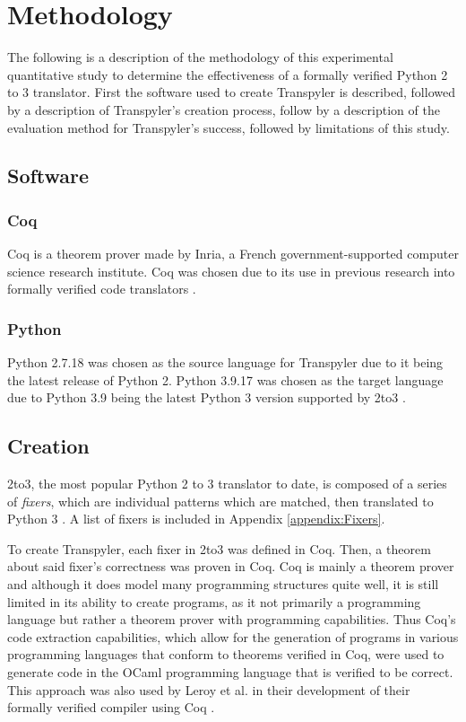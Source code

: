 \section{Methodology}
The following is a description of the methodology of this experimental quantitative study to determine the effectiveness of a formally verified Python 2 to 3 translator. First the software used to create Transpyler is described, followed by a description of Transpyler's creation process, follow by a description of the evaluation method for Transpyler's success, followed by limitations of this study.

\subsection{Software}
\subsubsection{Coq}
Coq is a theorem prover made by Inria, a French government-supported computer science research institute. Coq was chosen due to its use in previous research into formally verified code translators \autocite{Leroy}\autocite{Zhao}.
\subsubsection{Python}
Python 2.7.18 was chosen as the source language for Transpyler due to it being the latest release of Python 2. Python 3.9.17 was chosen as the target language due to Python 3.9 being the latest Python 3 version supported by 2to3 \autocite{2to3}.

\subsection{Creation}
2to3, the most popular Python 2 to 3 translator to date, is composed of a series of \textit{fixers}, which are individual patterns which are matched, then translated to Python 3 \autocite{2to3}. A list of fixers is included in Appendix \ref{appendix:Fixers}.

To create Transpyler, each fixer in 2to3 was defined in Coq. Then, a theorem about said fixer's correctness was proven in Coq. Coq is mainly a theorem prover and although it does model many programming structures quite well, it is still limited in its ability to create programs, as it not primarily a programming language but rather a theorem prover with programming capabilities. Thus Coq's code extraction capabilities, which allow for the generation of programs in various programming languages that conform to theorems verified in Coq, were used to generate code in the OCaml programming language that is verified to be correct. This approach was also used by Leroy et al. in their development of their formally verified compiler using Coq \autocite{Leroy}.

